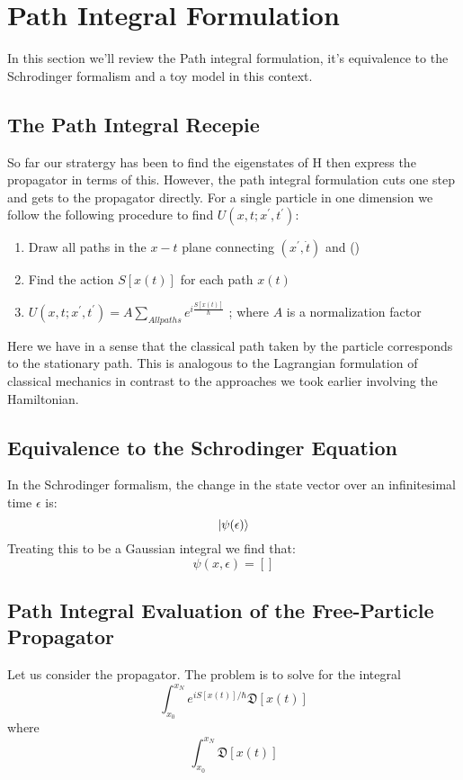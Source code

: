 \chapter{Path Integral Formulation}
In this section we'll review the Path integral formulation, it's equivalence to the Schrodinger formalism and a toy model in this context.
\section{The Path Integral Recepie}
So far our stratergy has been to find the eigenstates of H then express the propagator in terms of this. However, the path integral formulation cuts one step and gets to the propagator directly. For a single particle in one dimension we follow the following procedure to find $U(x,t;x^{'}, t^{'})$:
\begin{enumerate}
	\item Draw all paths in the $x-t$ plane connecting $(x^{'}, \dot{t})$ and ()
	\item Find the action $S[x(t)]$ for each path $x(t)$
	\item $U(x,t;x^{'}, t^{'}) = A \sum_{All paths} e^{i\frac{S[x(t)]}{\hbar} }$  ; where $A$ is a normalization factor
\end{enumerate}
Here we have in a sense that the classical path taken by the particle corresponds to the stationary path. This is analogous to the Lagrangian formulation of classical mechanics in contrast to the approaches we took earlier involving the Hamiltonian.
\section{Equivalence to the Schrodinger Equation}
In the Schrodinger formalism, the change in the state vector over an infinitesimal time $\epsilon$ is:
\begin{equation}
	\ket{\psi(\epsilon)}
\end{equation}
Treating this to be a Gaussian integral we find that:
\begin{equation}
\psi(x, \epsilon) = \left[ \right]
\end{equation}
\section{Path Integral Evaluation of the Free-Particle Propagator}
Let us consider the propagator. The problem is to solve for the integral
\begin{equation}
\int^{x_{N}}_{x_{0}}e^{iS[x(t)]/ \hbar}\mathfrak{D}[x(t)]
\end{equation}
where
$$\int^{x_{N}}_{x_{0}}\mathfrak{D}[x(t)]$$
